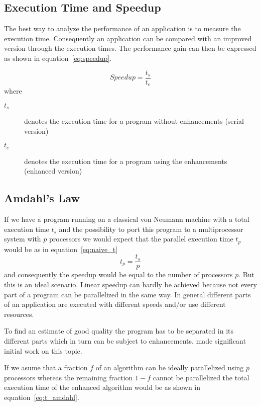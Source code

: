 \subsection{Execution Time and Speedup}
\label{sec:speedup}
The best way to analyze the performance of an application is to
measure the execution time. Consequently an application can be compared
with an improved version through the execution times.
The performance gain can then be expressed as shown in
equation~\ref{eq:speedup}. 

\begin{equation}
\label{eq:speedup}
Speedup = \frac{t_s}{t_e}
\end{equation}
where
\begin{description}
\item[$t_s$] denotes the execution time for a program without
  enhancements (serial version)
\item[$t_e$] denotes the execution time for a program using the
  enhancements (enhanced version)
\end{description}

\subsection{Amdahl's Law}

If we have a program running on a classical von Neumann machine with a
total execution time $t_s$ and the possibility to port this program to
a multiprocessor system with $p$ processors we would expect that the
parallel execution time $t_p$ would be as in equation~\ref{eq:naive_t}
\begin{equation}
\label{eq:naive_t}
t_p = \frac{t_s}{p}
\end{equation}
and consequently the speedup would be equal to the number of
processors $p$.
But this is an ideal scenario. Linear speedup can hardly be achieved
because not every part of a program can be parallelized in the same
way. In general different parts of an application are executed with
different speeds and/or use different resources.

To find an estimate of good quality the program has to be separated in its
different parts which in turn can be subject to
enhancements. \cite{amdahl67vsp} made significant initial work on this
topic.

If we asume that a fraction $f$ of an algorithm can be ideally
parallelized using $p$ processors whereas the remaining fraction $1 -
f$ cannot be 
parallelized the total execution time of the enhanced algorithm would
be as shown in equation~\ref{eq:t_amdahl}.

